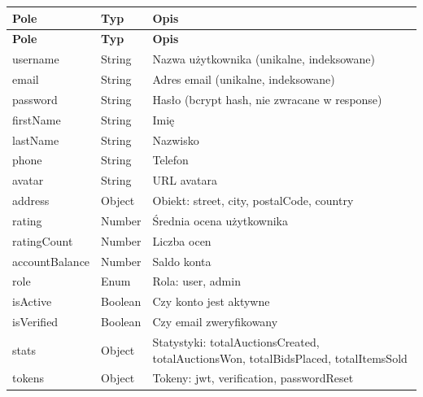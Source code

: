 \begin{longtable}{|p{3.5cm}|p{2.5cm}|p{8cm}|}
  \hline
  \textbf{Pole}  & \textbf{Typ} & \textbf{Opis}                                                                       \\ \hline
  \endfirsthead
  \hline
  \textbf{Pole}  & \textbf{Typ} & \textbf{Opis}                                                                       \\ \hline
  \endhead

  username       & String       & Nazwa użytkownika (unikalne, indeksowane)                                           \\ \hline
  email          & String       & Adres email (unikalne, indeksowane)                                                 \\ \hline
  password       & String       & Hasło (bcrypt hash, nie zwracane w response)                                        \\ \hline
  firstName      & String       & Imię                                                                                \\ \hline
  lastName       & String       & Nazwisko                                                                            \\ \hline
  phone          & String       & Telefon                                                                             \\ \hline
  avatar         & String       & URL avatara                                                                         \\ \hline
  address        & Object       & Obiekt: street, city, postalCode, country                                           \\ \hline
  rating         & Number       & Średnia ocena użytkownika                                                           \\ \hline
  ratingCount    & Number       & Liczba ocen                                                                         \\ \hline
  accountBalance & Number       & Saldo konta                                                                         \\ \hline
  role           & Enum         & Rola: user, admin                                                                   \\ \hline
  isActive       & Boolean      & Czy konto jest aktywne                                                              \\ \hline
  isVerified     & Boolean      & Czy email zweryfikowany                                                             \\ \hline
  stats          & Object       & Statystyki: totalAuctionsCreated, totalAuctionsWon, totalBidsPlaced, totalItemsSold \\ \hline
  tokens         & Object       & Tokeny: jwt, verification, passwordReset                                            \\ \hline
\end{longtable}

